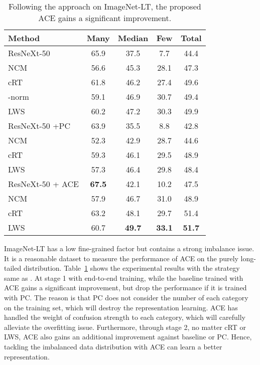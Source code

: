 \documentclass{article}
\begin{document}
\begin{table}[ht!]
    \centering
    \caption{Following the approach \cite{Kang2020Decoupling} on ImageNet-LT, the proposed ACE gains a significant improvement.}
    \label{tab:imagenet_lt}
    \begin{tabular}{lcccc}
        \toprule
        Method   & Many & Median & Few & Total \\
        \midrule
        \midrule
        ResNeXt-50 & 65.9	& 37.5	 & 7.7 & 44.4 \\
        \midrule
        NCM     & 56.6 & 45.3 & 28.1 & 47.3 \\
        cRT     & 61.8 & 46.2 & 27.4 & 49.6 \\
        -norm & 59.1 & 46.9 & 30.7 & 49.4 \\
        LWS     & 60.2 & 47.2 & 30.3 & 49.9 \\
        \midrule
        \midrule
        ResNeXt-50 +PC & 63.9 & 35.5 & 8.8 & 42.8 \\
        \midrule
        NCM     & 52.3 & 42.9 & 28.7 & 44.6 \\
        cRT     & 59.3 & 46.1 & 29.5 & 48.9 \\
        LWS     & 57.3 & 46.4 & 29.8 & 48.4 \\
        \midrule
        \midrule
        ResNeXt-50 + ACE & \bf 67.5 & 42.1 & 10.2 & 47.5 \\
        \midrule
        NCM     & 57.9 & 46.7 & 31.0 & 48.9 \\
        cRT     & 63.2 & 48.1 & 29.7 & 51.4 \\
        LWS     & 60.7 & \bf 49.7 & \bf 33.1 & \bf 51.7 \\
        \bottomrule
    \end{tabular}
    \vspace{-10pt}
\end{table}

ImageNet-LT has a low fine-grained factor but contains a strong imbalance issue. It is a reasonable dataset to measure the performance of ACE on the purely long-tailed distribution. Table~\ref{tab:imagenet_lt} shows the experimental results with the strategy same as \cite{Kang2020Decoupling}. At stage 1 with end-to-end training, while the baseline trained with ACE gains a significant improvement, but drop the performance if it is trained with PC. The reason is that PC does not consider the number of each category on the training set, which will destroy the representation learning. ACE has handled the weight of confusion strength to each category, which will carefully alleviate the overfitting issue. Furthermore, through stage 2, no matter cRT or LWS, ACE also gains an additional improvement against baseline or PC. Hence, tackling the imbalanced data distribution with ACE can learn a better representation.
\end{document}
